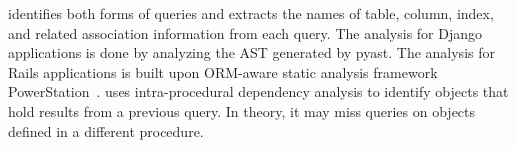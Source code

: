 

\Tool identifies both forms of queries
and extracts the names
of table, column, index, and related association information from each query. The analysis for Django applications is done by
analyzing the AST generated by pyast. 
The analysis
for Rails applications is 
built upon ORM-aware static analysis framework  PowerStation~\cite{yang2018powerstation}. 
\Tool uses intra-procedural dependency analysis to identify objects that hold results from a previous query.
In theory, it may miss queries on objects defined
in a different procedure.%







